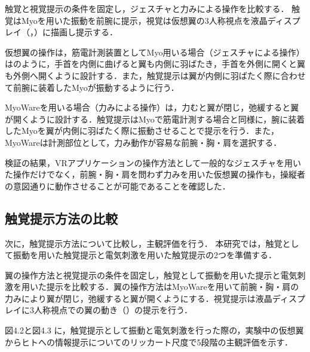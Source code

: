 \begin{small}
      触覚と視覚提示の条件を固定し，ジェスチャと力みによる操作を比較する． 触覚はMyoを用いた振動を前腕に提示，視覚は仮想翼の3人称視点を液晶ディスプレイ（，）に描画し提示する．

      仮想翼の操作は，筋電計測装置としてMyo用いる場合（ジェスチャによる操作）はのように，手首を内側に曲げると翼も内側に羽ばたき，手首を外側に開くと翼も外側へ開くように設計する．また，触覚提示は翼が内側に羽ばたく際に合わせて前腕に装着したMyoが振動するように行う．
      
      MyoWareを用いる場合（力みによる操作）は，力むと翼が閉じ，弛緩すると翼が開くように設計する．触覚提示はMyoで筋電計測する場合と同様に，腕に装着したMyoを翼が内側に羽ばたく際に振動させることで提示を行う．また，MyoWareは計測部位として，力み動作が容易な前腕・胸・肩を選択する．

      検証の結果，VRアプリケーションの操作方法として一般的なジェスチャを用いた操作だけでなく，前腕・胸・肩を問わず力みを用いた仮想翼の操作も，操縦者の意図通りに動作させることが可能であることを確認した．

    \subsection{触覚提示方法の比較} %
      次に，触覚提示方法について比較し，主観評価を行う．
      本研究では，触覚として振動を用いた触覚提示と電気刺激を用いた触覚提示の2つを準備する．

      翼の操作方法と視覚提示の条件を固定し，触覚として振動を用いた提示と電気刺激を用いた提示を比較する．翼の操作方法はMyoWareを用いて前腕・胸・肩の力みにより翼が閉じ，弛緩すると翼が開くようにする．視覚提示は液晶ディスプレイに3人称視点での翼の動き（）の提示を行う．

      図4.2と図4.3
      に，触覚提示として振動と電気刺激を行った際の，実験中の仮想翼からヒトへの情報提示についてのリッカート尺度で5段階の主観評価を示す．


\end{small}
